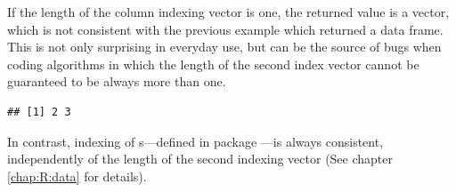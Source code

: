 \documentclass[krantz2]{krantz}\usepackage{knitr}%
\begin{document}
\begin{explainbox}
If the length of the column indexing vector is one, the returned value is a vector, which is not consistent with the previous example which returned a data frame. This is not only surprising in everyday use, but can be the source of bugs when coding algorithms in which the length of the second index vector cannot be guaranteed to be always more than one.

\begin{knitrout}\footnotesize
{}\color{fgcolor}\begin{kframe}
\begin{alltt}
\hlstd{a.df[}\hlopt{:}\hlstd{,} \hlstd{]}
\end{alltt}
\begin{verbatim}
## [1] 2 3
\end{verbatim}
\end{kframe}
\end{knitrout}

In contrast, indexing of s---defined in package ---is always consistent, independently of the length of the second indexing vector (See chapter \ref{chap:R:data} for details).
\end{explainbox}
\end{document}
